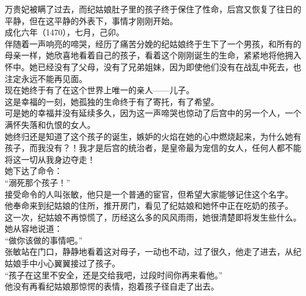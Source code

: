 \begin{multicols}{\theparacolNo}
万贵妃被瞒了过去，而纪姑娘肚子里的孩子终于保住了性命，后宫又恢复了往日的平静，但在这平静的外表下，事情才刚刚开始。\\

成化六年（1470），七月，己卯。\\

伴随着一声响亮的啼哭，经历了痛苦分娩的纪姑娘终于生下了一个男孩，和所有的母亲一样，她欣喜地看着自己的孩子，看着这个刚刚诞生的生命，紧紧地将他拥入怀中。她已经没有了父母，没有了兄弟姐妹，因为即使他们没有在战乱中死去，也注定永远不能再见面。\\

现在她终于有了在这个世界上唯一的亲人——儿子。\\

这是幸福的一刻，她孤独的生命终于有了寄托，有了希望。\\

可是她的幸福并没有延续多久，因为这一声啼哭也惊动了后宫中的另一个人，一个满怀失落和仇恨的女人。\\

她终归还是知道了这个孩子的诞生，嫉妒的火焰在她的心中燃烧起来，为什么她有孩子，而我没有？！我才是后宫的统治者，是皇帝最为宠信的女人，任何人都不能将这一切从我身边夺走！\\

她下达了命令：\\

“溺死那个孩子！”\\

接受命令的人叫张敏，他只是一个普通的宦官，但希望大家能够记住这个名字。\\

他奉命来到纪姑娘的住所，推开房门，看见了纪姑娘和她怀中正在吃奶的孩子。\\

这一次，纪姑娘不再惊慌了，历经这么多的风风雨雨，她很清楚即将发生些什么。\\

她从容地说道：\\

“做你该做的事情吧。”\\

张敏站在门口，静静地看着这对母子，一动也不动，过了很久，他走了进去，从纪姑娘手中小心翼翼接过了孩子。\\

“孩子在这里不安全，还是交给我吧，过段时间你再来看他。”\\

他没有再看纪姑娘那惊愕的表情，抱着孩子径自走了出去。\\


\end{multicols}
